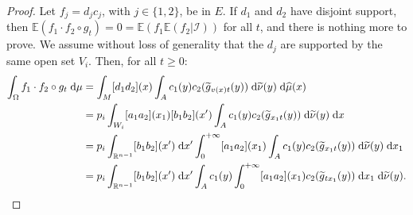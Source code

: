 \documentclass[AHL,Unicode,longabstracts]{cedram}
\newcommand{\R}{\mathbb{R}}
\newcommand{\Ebb}{\mathbb{E}}
\newcommand{\Ical}{\mathcal{I}}
\newcommand{\dd}{\;{\rm d}}
\let\oldtilde\tilde
\renewcommand*{\tilde}[1]{\mathchoice{\widetilde{#1}}{\widetilde{#1}}{\oldtilde{#1}}{\oldtilde{#1}}}\let\oldhat\hat
\renewcommand*{\hat}[1]{\mathchoice{\widehat{#1}}{\widehat{#1}}{\oldhat{#1}}{\oldhat{#1}}}\let\oldforall\forall
\renewcommand*{\forall}{\mathrel{\oldforall}}
\begin{document}
\begin{proof}
Let $f_j = d_j c_j$, with $j \in \{1,2\}$, be in $E$. If $d_1$ and $d_2$ have disjoint support, then $\Ebb (f_1 \cdot f_2 \circ g_t) = 0 = \Ebb (f_1 \Ebb (f_2| \Ical))$ for all $t$, and there is nothing more to prove. We assume without loss of generality that the $d_j$ are supported by the same open set $V_i$. Then, for all $t \geq 0$:
\begin{align*}
\int_\Omega f_1 \cdot f_2 \circ g_t \dd \mu & = \int_M [d_1 d_2] (x) \int_A c_1 (y) c_2 (\tilde{g}_{v(x)t} (y)) \dd \tilde{\nu} (y) \dd \hat{\mu} (x) \\
& = p_i \int_{W_i} [a_1 a_2] (x_1) [b_1 b_2] (x') \int_A c_1 (y) c_2 (\tilde{g}_{x_1 t} (y)) \dd \tilde{\nu} (y) \dd x \\
& = p_i \int_{\R^{n-1}} [b_1 b_2] (x') \dd x' \int_0^{+\infty} [a_1 a_2] (x_1) \int_A c_1 (y) c_2 (\tilde{g}_{x_1 t} (y)) \dd \tilde{\nu} (y) \dd x_1 \\
& = p_i \int_{\R^{n-1}} [b_1 b_2] (x') \dd x' \int_A c_1 (y) \int_0^{+\infty} [a_1 a_2] (x_1) c_2 (\tilde{g}_{t x_1} (y)) \dd x_1 \dd \tilde{\nu} (y).
\end{align*}


\end{proof}
\end{document}
